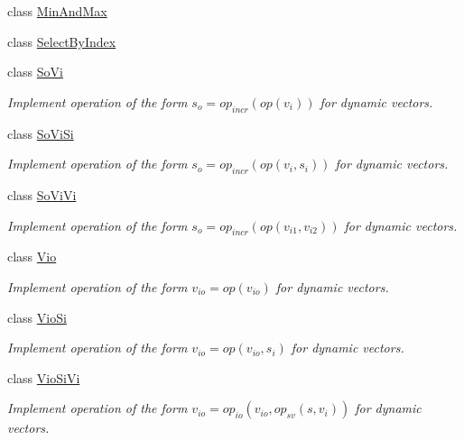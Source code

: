 \begin{DoxyCompactItemize}
\item 
class \hyperlink{classvct_dynamic_vector_loop_engines_1_1_min_and_max}{Min\+And\+Max}
\item 
class \hyperlink{classvct_dynamic_vector_loop_engines_1_1_select_by_index}{Select\+By\+Index}
\item 
class \hyperlink{classvct_dynamic_vector_loop_engines_1_1_so_vi}{So\+Vi}
\begin{DoxyCompactList}\small\item\em Implement operation of the form $s_o = op_{incr}(op(v_i))$ for dynamic vectors. \end{DoxyCompactList}\item 
class \hyperlink{classvct_dynamic_vector_loop_engines_1_1_so_vi_si}{So\+Vi\+Si}
\begin{DoxyCompactList}\small\item\em Implement operation of the form $s_o = op_{incr}(op(v_i, s_i))$ for dynamic vectors. \end{DoxyCompactList}\item 
class \hyperlink{classvct_dynamic_vector_loop_engines_1_1_so_vi_vi}{So\+Vi\+Vi}
\begin{DoxyCompactList}\small\item\em Implement operation of the form $s_o = op_{incr}(op(v_{i1}, v_{i2}))$ for dynamic vectors. \end{DoxyCompactList}\item 
class \hyperlink{classvct_dynamic_vector_loop_engines_1_1_vio}{Vio}
\begin{DoxyCompactList}\small\item\em Implement operation of the form $v_{io} = op(v_{io})$ for dynamic vectors. \end{DoxyCompactList}\item 
class \hyperlink{classvct_dynamic_vector_loop_engines_1_1_vio_si}{Vio\+Si}
\begin{DoxyCompactList}\small\item\em Implement operation of the form $ v_{io} = op(v_{io}, s_i)$ for dynamic vectors. \end{DoxyCompactList}\item 
class \hyperlink{classvct_dynamic_vector_loop_engines_1_1_vio_si_vi}{Vio\+Si\+Vi}
\begin{DoxyCompactList}\small\item\em Implement operation of the form $v_{io} = op_{io}(v_{io}, op_{sv}(s, v_i))$ for dynamic vectors. \end{DoxyCompactList}\item 

\end{DoxyCompactItemize}
